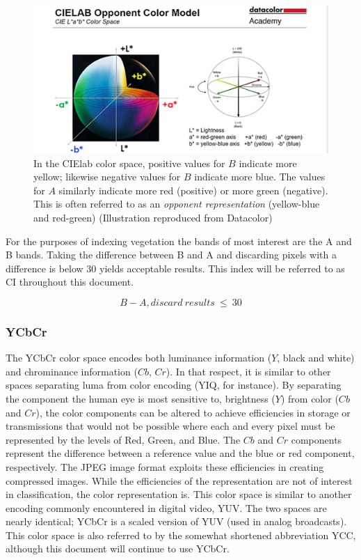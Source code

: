 \documentclass[letterpaper]{report}
\begin{document}
{\begin{figure}[H]
	\centering
	\includegraphics[width=.65\linewidth]{./figures/cielab-colorspace.png}
	\caption[CIElab color space]{In the CIElab color space, positive values for $B$ indicate more yellow; likewise negative values for $B$ indicate more blue. The values for $A$ similarly indicate more red (positive) or more green (negative). This is often referred to as an \textit{opponent representation} (yellow-blue and red-green) (Illustration reproduced from Datacolor)}
	\label{fig:cielab}	
\end{figure}

 For the purposes of indexing vegetation the bands of  most interest are the A and B bands. Taking the difference between B and A and discarding pixels with a difference is below 30 yields acceptable results. This index will be referred to as CI throughout this document.

\begin{equation}\label{eqn:index-cielab}
		B - A, discard~results~\leq~30
\end{equation}

\subsubsection{YCbCr}
\label{section:ycbcri}
The YCbCr color space encodes both luminance information ($Y$, black and white) and chrominance information ($Cb$, $Cr$). In that respect, it is similar to other spaces separating luma from color encoding (YIQ, for instance). By separating the component the human eye is most sensitive to, brightness ($Y$) from color ($Cb$ and $Cr$), the color components can be altered to achieve efficiencies in storage or transmissions that would not be possible where each and every pixel must be represented by the levels of Red, Green, and Blue.  The $Cb$ and $Cr$ components represent the difference between a reference value and the blue or red component, respectively. The JPEG image format exploits these efficiencies in creating compressed images. While the efficiencies of the representation are not of interest in classification, the color representation is. This color space is similar to another encoding commonly encountered in digital video, YUV. The two spaces are nearly identical; YCbCr is a scaled version of YUV (used in analog broadcasts). This color space is also referred to by the somewhat shortened abbreviation YCC, although this document will continue to use YCbCr.

}
\end{document}
